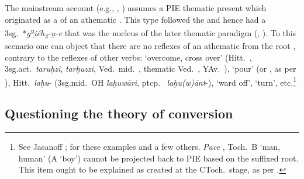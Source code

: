 \documentclass[output=paper,colorlinks,citecolor=brown]{langscibook}
\begin{document}
The mainstream account (e.g., , \citealt[142]{Jasanoff2003}) assumes a PIE thematic present which originated as a  of an  athematic  .  This type followed the   and hence had a  3sg.\ *\textit{g\textsuperscript{u̯}i̯éh\textsubscript{3}-u̯-e} that was the nucleus of the later thematic paradigm (\citealt{Jasanoff2003}, \citeyear{Jasanoff2023}). To this scenario one can object that there are no reflexes of an athematic  from the root , contrary to the reflexes of other verbs:  ‘overcome, cross over’ (Hitt.\ , 3sg.act.\ \textit{taruḫzi}, \textit{tarḫuzzi}, Ved.\  mid.\ , thematic Ved.\ , YAv.\ ),  ‘pour’ (or , as per \citealt{Melchert2011}), Hitt.\ \textit{laḫu}- (3sg.mid.\ OH \textit{laḫuwāri}, ptcp.\  \textit{laḫu(w)ānt}-),      ‘ward off’,  ‘turn’, etc.\footnote{See Jasanoff \citeyear[141--143]{Jasanoff2003}; \citeyear[63--66]{Jasanoff2023} for these examples and a few others. \textit{Pace} \citealt[66]{Jasanoff2023}, Toch.\ B  ‘man, human’ (A  ‘boy’) cannot be projected back to PIE  based on the suffixed root. This item ought to be explained as created at the CToch.\ stage, as per \citealt[119--120]{Pinault2021}.}   

\subsection{Questioning the theory of conversion}
\end{document}
